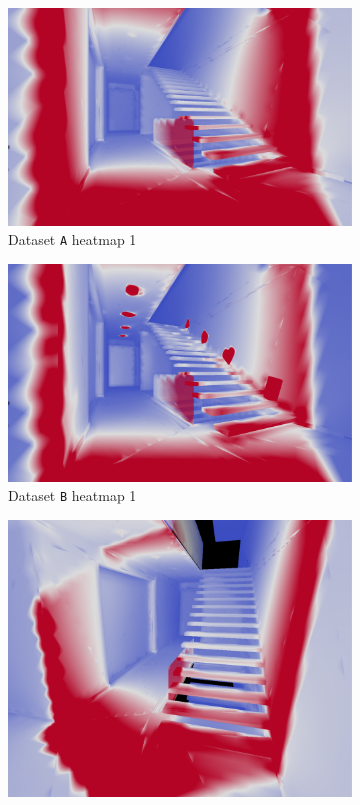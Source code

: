 \begin{figure}
	\centering
	\begin{subfigure}[t]{0.35\linewidth}
		\includegraphics[width=\textwidth]{chapters/chapter_results/a_heatmap1}
		\caption{Dataset \texttt{A} heatmap 1}
	\end{subfigure}
	\begin{subfigure}[t]{0.35\linewidth}
		\includegraphics[width=\textwidth]{chapters/chapter_results/b_heatmap1}
		\caption{Dataset \texttt{B} heatmap 1}
	\end{subfigure}
	\begin{subfigure}[t]{0.35\linewidth}
		\includegraphics[width=\textwidth]{chapters/chapter_results/a_heatmap2}

\end{subfigure}
\end{figure}
